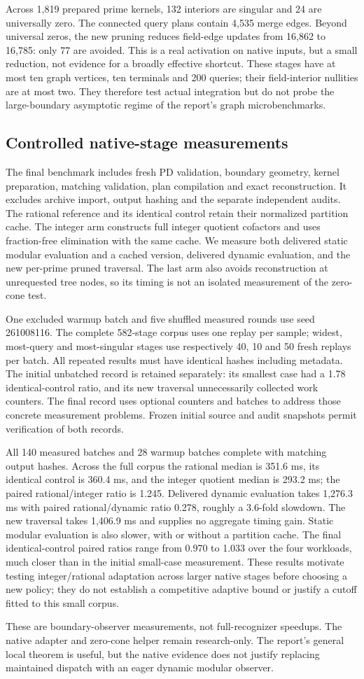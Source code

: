 Across 1,819 prepared prime kernels, 132 interiors are singular and 24 are
universally zero. The connected query plans contain 4,535 merge edges.
Beyond universal zeros, the new pruning reduces field-edge updates from
16,862 to 16,785: only 77 are avoided. This is a real activation on native
inputs, but a small reduction, not evidence for a broadly effective shortcut.
These stages have at most ten graph vertices, ten terminals and 200 queries;
their field-interior nullities are at most two. They therefore test actual
integration but do not probe the large-boundary asymptotic regime of the
report's graph microbenchmarks.

\subsection{Controlled native-stage measurements}



The final benchmark includes fresh PD validation, boundary geometry, kernel
preparation, matching validation, plan compilation and exact reconstruction.
It excludes archive import, output hashing and the separate independent
audits. The rational reference and its identical control retain their
normalized partition cache. The integer arm constructs full integer quotient
cofactors and uses fraction-free elimination with the same cache. We measure
both delivered static modular evaluation and a cached version, delivered
dynamic evaluation, and the new per-prime pruned traversal. The last arm
also avoids reconstruction at unrequested tree nodes, so its timing is not
an isolated measurement of the zero-cone test.

One excluded warmup batch and five shuffled measured rounds use seed
261008116. The complete 582-stage corpus uses one replay per sample; widest,
most-query and most-singular stages use respectively 40, 10 and 50 fresh
replays per batch. All repeated results must have identical hashes including
metadata. The initial unbatched record is retained separately: its smallest
case had a 1.78 identical-control ratio, and its new traversal unnecessarily
collected work counters. The final record uses optional counters and batches
to address those concrete measurement problems. Frozen initial source and
audit snapshots permit verification of both records.

All 140 measured batches and 28 warmup batches complete with matching output
hashes. Across the full corpus the rational median is 351.6 ms, its identical
control is 360.4 ms, and the integer quotient median is 293.2 ms; the paired
rational/integer ratio is 1.245. Delivered dynamic evaluation takes 1,276.3 ms
with paired rational/dynamic ratio 0.278, roughly a 3.6-fold slowdown.
The new traversal takes 1,406.9 ms and supplies no aggregate timing gain.
Static modular evaluation is also slower, with or without a partition cache.
The final identical-control paired ratios range from 0.970 to 1.033 over
the four workloads, much closer than in the initial small-case measurement.
These results motivate testing integer/rational adaptation across larger
native stages before choosing a new policy; they do not establish a
competitive adaptive bound or justify a cutoff fitted to this small corpus.

These are boundary-observer measurements, not full-recognizer speedups.
The native adapter and zero-cone helper remain research-only. The report's
general local theorem is useful, but the native evidence does not justify
replacing maintained dispatch with an eager dynamic modular observer.
